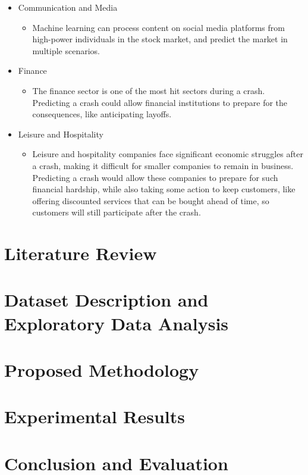 \documentclass{article}
\begin{document}
\newpage
	\begin{itemize}
		\item Communication and Media
			\begin{itemize}
				\item Machine learning can process content on social media platforms from high-power individuals in the stock market, and predict the market in multiple scenarios.   
			\end{itemize}
		\item Finance
			\begin{itemize}
				\item The finance sector is one of the most hit sectors during a crash. Predicting a crash could allow financial institutions to prepare for the consequences, like anticipating layoffs.
			\end{itemize}
		\item Leisure and Hospitality 
			\begin{itemize}
				\item Leisure and hospitality companies face significant economic struggles after a crash, making it difficult for smaller companies to remain in business. Predicting a crash would allow these companies to prepare for such financial hardship, while also taking some action to keep customers, like offering discounted services that can be bought ahead of time, so customers will still participate after the crash. 
			\end{itemize}
	\end{itemize}
 
\section{Literature Review} 
\section{Dataset Description and Exploratory Data Analysis} 
\section{Proposed Methodology} 
\section{Experimental Results} 
\section{Conclusion and Evaluation} 
 
\end{document}
